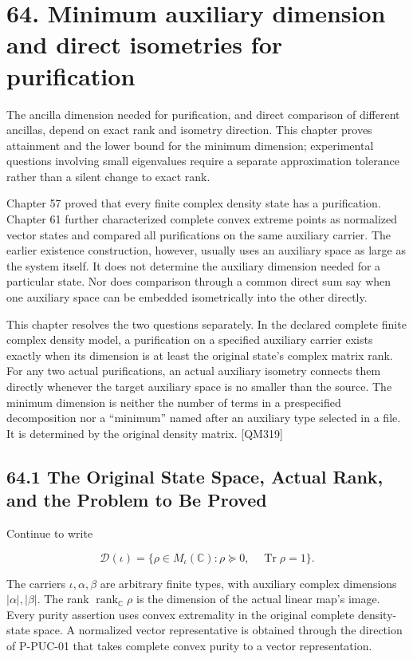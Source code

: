 \documentclass[
  11pt,
  oneside]{book}
\begin{document}
\chapter{64. Minimum auxiliary dimension and direct isometries for
purification}\label{ch-64}

The ancilla dimension needed for purification, and direct comparison of
different ancillas, depend on exact rank and isometry direction. This
chapter proves attainment and the lower bound for the minimum dimension;
experimental questions involving small eigenvalues require a separate
approximation tolerance rather than a silent change to exact rank.

Chapter 57 proved that every finite complex density state has a
purification. Chapter 61 further characterized complete convex extreme
points as normalized vector states and compared all purifications on the
same auxiliary carrier. The earlier existence construction, however,
usually uses an auxiliary space as large as the system itself. It does
not determine the auxiliary dimension needed for a particular state. Nor
does comparison through a common direct sum say when one auxiliary space
can be embedded isometrically into the other directly.

This chapter resolves the two questions separately. In the declared
complete finite complex density model, a purification on a specified
auxiliary carrier exists exactly when its dimension is at least the
original state's complex matrix rank. For any two actual purifications,
an actual auxiliary isometry connects them directly whenever the target
auxiliary space is no smaller than the source. The minimum dimension is
neither the number of terms in a prespecified decomposition nor a
``minimum'' named after an auxiliary type selected in a file. It is
determined by the original density matrix. {[}QM319{]}

\section{64.1 The Original State Space, Actual Rank, and the Problem to
Be Proved}

Continue to write

\[
\mathcal D(\iota)=\{\rho\in M_\iota(\mathbb C):\rho\succeq0,\quad
\operatorname{Tr}\rho=1\}.
\]

The carriers \(\iota,\alpha,\beta\) are arbitrary finite types, with
auxiliary complex dimensions \(|\alpha|,|\beta|\). The rank
\(\operatorname{rank}_{\mathbb C}\rho\) is the dimension of the actual
linear map's image. Every purity assertion uses convex extremality in
the original complete density-state space. A normalized vector
representative is obtained through the direction of P-PUC-01 that takes
complete convex purity to a vector representation.
\end{document}
